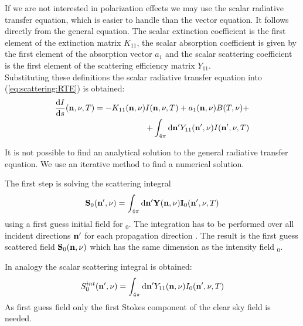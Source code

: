 If we are not interested in polarization effects we may use the scalar
radiative transfer equation, which is easier to handle than the vector
equation. It follows directly from the general equation. The scalar
extinction coefficient is the first element of the extinction matrix
$K_{11}$, the scalar absorption coefficient is given by the first
element of the absorption vector $a_1$ and the scalar scattering
coefficient is the first element of the scattering efficiency matrix
$Y_{11}$.\\
Substituting these definitions the scalar radiative transfer equation
into (\ref{eq:scattering:RTE}) is obtained:
\begin{eqnarray}
  \label{eq:scattering:scalar_rte}
\frac{\mathrm{d} I}{\mathrm{d} s} ({\bf n}, \nu, T) = -K_{11}({\bf n}, \nu)I
({\bf n}, \nu, T) + a_1({\bf n}, \nu)B(T,\nu) + \\ \nonumber
 +\int_{4\pi} \mathrm{d} {\bf n}^\prime Y_{11}({\bf n}^\prime, \nu) I({\bf n}^\prime, \nu, T)
\end{eqnarray}

\label{sec:scattering:solution_rte}

It is not possible to find an analytical solution to the general
radiative transfer equation. We use an iterative method to find a
numerical solution.

\label{sec:scattering:scat_int}

The first step is solving the scattering integral
\begin{eqnarray}
  {\bf S}_0 ({\bf n}^\prime, \nu)  = \int_{4\pi} \mathrm{d} {\bf n}^\prime
  {\bf Y}({\bf n}, \nu) {\bf I}_0({\bf n}^\prime, \nu, T) 
\end{eqnarray}
using a first guess initial field for \StoVec$_0$\DirFrePr . The integration
has to be performed over all incident directions ${\bf n}^\prime$ for each
propagation direction \PDir{}. The result is the first guess scattered field ${\bf S}_0({\bf n}, \nu)$
which has the same dimension as the intensity field \StoVec$_0$\DirFrePr. 

In analogy the scalar scattering integral is obtained:
\begin{eqnarray}
  S_0^{int} ({\bf n}^\prime, \nu)  = \int_{4\pi} \mathrm{d} {\bf n}^\prime Y_{11}({\bf n}, \nu) I_0({\bf n}^\prime, \nu, T) 
\end{eqnarray}
As first guess field only the first Stokes component of the clear sky
field is needed.


